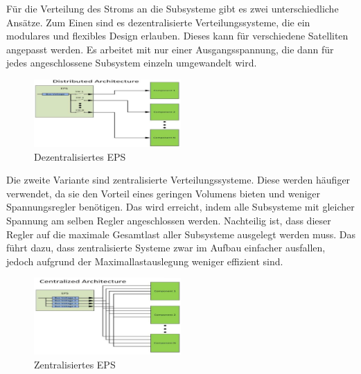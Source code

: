 	Für die Verteilung des Stroms an die Subsysteme gibt es zwei unterschiedliche Ansätze. Zum Einen sind es dezentralisierte Verteilungssysteme, die ein modulares und flexibles Design erlauben. Dieses kann für verschiedene Satelliten angepasst werden. Es arbeitet mit nur einer Ausgangsspannung, die dann für jedes angeschlossene Subsystem einzeln umgewandelt wird.\\
\begin{figure}[!h]
	\centering
		\includegraphics[width=0.50\textwidth]{./graphics/Distributed_EPS.PNG}
	\caption{Dezentralisiertes EPS \cite{Abaker.2017}}
\end{figure}

 Die zweite Variante sind zentralisierte Verteilungssysteme. Diese werden häufiger verwendet, da sie den Vorteil eines geringen Volumens bieten und weniger Spannungsregler benötigen. Das wird erreicht, indem alle Subsysteme mit gleicher Spannung am selben Regler angeschlossen werden. Nachteilig ist, dass dieser Regler auf die maximale Gesamtlast aller Subsysteme ausgelegt werden muss. Das führt dazu, dass zentralisierte Systeme zwar im Aufbau einfacher ausfallen, jedoch aufgrund der Maximallastauslegung weniger effizient sind.\cite{Abaker.2017}
\begin{figure}[!h]
	\centering
		\includegraphics[width=0.50\textwidth]{./graphics/Centralized_EPS.PNG}
	\caption{Zentralisiertes EPS \cite{Abaker.2017}}
\end{figure}




